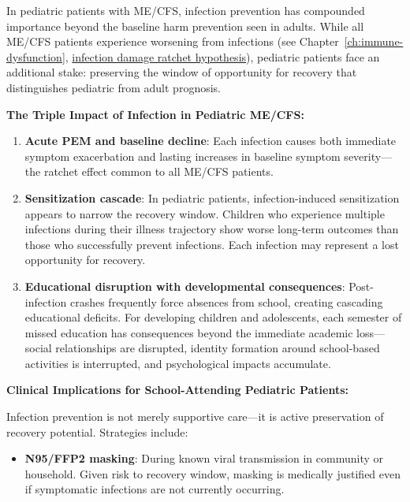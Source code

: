 \begin{observation}
\label{obs:ped-infection-recovery-window}

In pediatric patients with ME/CFS, infection prevention has compounded importance beyond the baseline harm prevention seen in adults. While all ME/CFS patients experience worsening from infections (see Chapter~\ref{ch:immune-dysfunction}, \hyperref[spec:infection-damage-ratchet]{infection damage ratchet hypothesis}), pediatric patients face an additional stake: preserving the window of opportunity for recovery that distinguishes pediatric from adult prognosis.

\textbf{The Triple Impact of Infection in Pediatric ME/CFS:}

\begin{enumerate}
    \item \textbf{Acute PEM and baseline decline}: Each infection causes both immediate symptom exacerbation and lasting increases in baseline symptom severity---the ratchet effect common to all ME/CFS patients.

    \item \textbf{Sensitization cascade}: In pediatric patients, infection-induced sensitization appears to narrow the recovery window. Children who experience multiple infections during their illness trajectory show worse long-term outcomes than those who successfully prevent infections. Each infection may represent a lost opportunity for recovery.

    \item \textbf{Educational disruption with developmental consequences}: Post-infection crashes frequently force absences from school, creating cascading educational deficits. For developing children and adolescents, each semester of missed education has consequences beyond the immediate academic loss---social relationships are disrupted, identity formation around school-based activities is interrupted, and psychological impacts accumulate.
\end{enumerate}

\textbf{Clinical Implications for School-Attending Pediatric Patients:}

Infection prevention is not merely supportive care---it is active preservation of recovery potential. Strategies include:

\begin{itemize}
    \item \textbf{N95/FFP2 masking}: During known viral transmission in community or household. Given risk to recovery window, masking is medically justified even if symptomatic infections are not currently occurring.


\end{itemize}
\end{observation}
